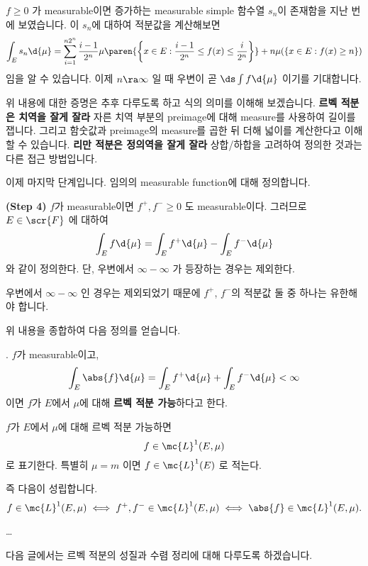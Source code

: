 \(f \geq 0\) 가 measurable이면 증가하는 measurable simple 함수열 \(s_n\)이 존재함을 지난 번에 보였습니다. 이 \(s_n\)에 대하여 적분값을 계산해보면
\[
    \int_E s_n \d{\mu} = \sum_{i=1}^{n2^n} \frac{i - 1}{2^n}\mu\paren{\left\{x \in E : \frac{i-1}{2^n} \leq f(x) \leq \frac{i}{2^n}\right\}} + n\mu(\{x \in E : f(x)\geq n\})
\]
임을 알 수 있습니다. 이제 \(n \ra \infty\) 일 때 우변이 곧 \(\ds \int f \d{\mu}\) 이기를 기대합니다.

위 내용에 대한 증명은 추후 다루도록 하고 식의 의미를 이해해 보겠습니다. \textbf{르벡 적분은 치역을 잘게 잘라} 자른 치역 부분의 preimage에 대해 measure를 사용하여 길이를 잽니다. 그리고 함숫값과 preimage의 measure를 곱한 뒤 더해 넓이를 계산한다고 이해할 수 있습니다. \textbf{리만 적분은 정의역을 잘게 잘라} 상합/하합을 고려하여 정의한 것과는 다른 접근 방법입니다.

이제 마지막 단계입니다. 임의의 measurable function에 대해 정의합니다.

\textbf{\sffamily (Step 4)} \(f\)가 measurable이면 \(f^+, f^- \geq 0\) 도 measurable이다. 그러므로 \(E \in \scr{F}\) 에 대하여
\[
    \int_E f \d{\mu} = \int_E f^+ \d{\mu} - \int_E f^- \d{\mu}
\]
와 같이 정의한다. 단, 우변에서 \(\infty - \infty\) 가 등장하는 경우는 제외한다.

우변에서 \(\infty - \infty\) 인 경우는 제외되었기 때문에 \(f^+\), \(f^-\)의 적분값 둘 중 하나는 유한해야 합니다.

위 내용을 종합하여 다음 정의를 얻습니다.

.  \(f\)가 measurable이고,
\[
    \int_E \abs{f} \d{\mu} = \int_E f^+ \d{\mu} + \int_E f^- \d{\mu} < \infty
\]
이면 \(f\)가 \(E\)에서 \(\mu\)에 대해 \textbf{르벡 적분 가능}하다고 한다.

\notation \(f\)가 \(E\)에서 \(\mu\)에 대해 르벡 적분 가능하면
\[
    f \in \mc{L}^1(E, \mu)
\]
로 표기한다. 특별히 \(\mu = m\) 이면 \(f \in \mc{L}^1(E)\) 로 적는다.

즉 다음이 성립합니다.
\[
    f \in \mc{L}^{1}(E, \mu) \iff f^+, f^- \in \mc{L}^{1}(E, \mu)\iff \abs{f} \in \mc{L}^{1}(E, \mu).
\]

\dots

다음 글에서는 르벡 적분의 성질과 수렴 정리에 대해 다루도록 하겠습니다.

\pagebreak
